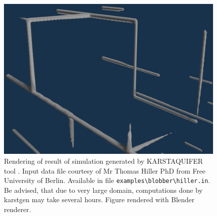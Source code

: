 \begin{figure}[htb]
  \begin{center}
    \includegraphics[width=\textwidth]{chapters/project/hiller_result.png}
  \end{center}
  \caption{Rendering of result of simulation generated by KARSTAQUIFER tool \parencite{Kaufmann200962}.
  Input data file courtesy of Mr Thomas Hiller PhD from Free University of Berlin.
  Available in file \texttt{examples\textbackslash blobber\textbackslash hiller.in}. Be advised, that
  due to very large domain, computations done by karstgen may take several hours.
  Figure rendered with Blender renderer.}
  \label{fig:hillershot}
\end{figure}

